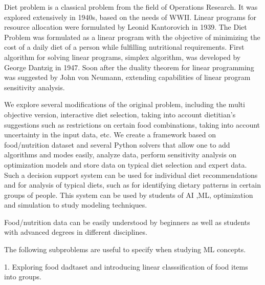 Diet problem is a classical problem from the field of Operations Research.  It was explored extensively in 1940s, based on the needs of WWII. Linear programs for resource allocation were formulated by Leonid Kantorovich in 1939. The Diet Problem was formulated as a linear program with the objective of minimizing the cost of a daily diet of a person while fulfilling nutritional requirements. First algorithm for solving linear programs, simplex algorithm, was developed by George Dantzig in 1947. Soon after the duality theorem for linear programming was suggested by John von Neumann, extending capabilities of linear program sensitivity analysis. 

We explore several modifications of the original problem, including the multi objective version, interactive diet selection, taking into account dietitian’s suggestions such as restrictions on certain food combinations, taking into account uncertainty in the input data, etc. We create a framework based on food/nutrition dataset and several Python solvers that allow one to add algorithms and modes easily, analyze data, perform sensitivity analysis on optimization models and store data on typical diet selection and expert data. Such a decision support system can be used for individual diet recommendations and for analysis of typical diets, such as for identifying dietary patterns in certain groups of people. This system can be used by students of AI ,ML,  optimization and simulation to study modeling techniques. 

Food/nutrition data can be easily understood by beginners as well as students with advanced degrees in different disciplines.  


The following subproblems are useful to specify when studying ML concepts. 

1. Exploring food dadtaset and introducing linear classsification of food items into groups. 

